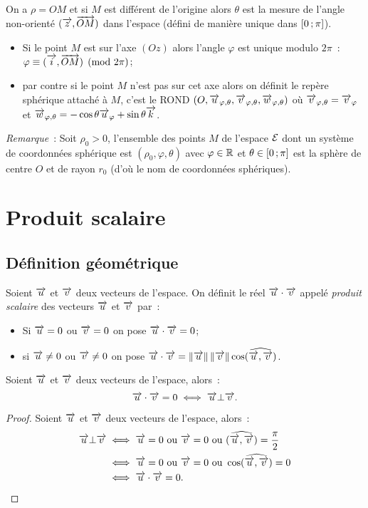 On a $\rho=OM$ et si $M$ est différent de l'origine alors $\theta$ est la mesure de l'angle non-orienté $(\overrightarrow{z},\overrightarrow{OM})$ dans l'espace (défini de manière unique dans $\left[ 0 \, ;  \pi \right]$).
\begin{itemize}
\item Si le point $M$ est sur l'axe $(Oz)$ alors l'angle $\varphi$ est unique modulo $2\pi$~: $\varphi \equiv (\overrightarrow{i},\overrightarrow{OM}) \pmod {2\pi}$;
\item par contre si le point $M$ n'est pas sur cet axe alors on définit le repère sphérique attaché à $M$, c'est le ROND $(O,\overrightarrow{u}_{\varphi,\theta},\overrightarrow{v}_{\varphi,\theta},\overrightarrow{w}_{\varphi,\theta})$ où $\overrightarrow{v}_{\varphi,\theta}=\overrightarrow{v}_{\varphi}$ et $\overrightarrow{w}_{\varphi,\theta}=-\cos\theta\overrightarrow{u}_\varphi+\sin\theta\overrightarrow{k}$.
\end{itemize}

\emph{Remarque}~: Soit $\rho_0>0$, l'ensemble des points $M$ de l'espace $\mathcal{E}$ dont un système de coordonnées sphérique est $(\rho_0,\varphi,\theta)$ avec $\varphi\in\mathbb{R}$ et $\theta\in \left[ 0 \, ;  \pi \right]$ est la sphère de centre $O$ et de rayon $r_0$ (d'où le nom de coordonnées sphériques).

\section{Produit scalaire}
\subsection{Définition géométrique}
\begin{defdef}
  Soient $\overrightarrow{u}$ et $\overrightarrow{v}$ deux vecteurs de l'espace. On définit le réel $\overrightarrow{u}\cdot\overrightarrow{v}$ appelé \emph{produit scalaire} des vecteurs $\overrightarrow{u}$ et $\overrightarrow{v}$ par~:
  \begin{itemize}
  \item Si $\overrightarrow{u}=0$ ou $\overrightarrow{v}=0$ on pose $\overrightarrow{u}\cdot\overrightarrow{v}=0$;
  \item si $\overrightarrow{u}\neq 0$ ou $\overrightarrow{v}\neq 0$ on pose $\overrightarrow{u}\cdot\overrightarrow{v}=\left\lVert\overrightarrow{u}\right\rVert\left\lVert\overrightarrow{v}\right\rVert\cos(\widehat{\overrightarrow{u},\overrightarrow{v}})$.
  \end{itemize}
\end{defdef}
\begin{prop}
Soient $\overrightarrow{u}$ et $\overrightarrow{v}$ deux vecteurs de l'espace, alors~:
\begin{equation}
  \overrightarrow{u}\cdot\overrightarrow{v}=0 \iff \overrightarrow{u} \bot \overrightarrow{v}.
\end{equation}
\end{prop}
\begin{proof}
  Soient $\overrightarrow{u}$ et $\overrightarrow{v}$ deux vecteurs de l'espace, alors~:
  \begin{align}
    \overrightarrow{u} \bot \overrightarrow{v} &\iff \overrightarrow{u}=0 \text{~ou~} \overrightarrow{v}=0 \text{~ou~} (\widehat{\overrightarrow{u},\overrightarrow{v}})=\frac{\pi}{2}\\
&\iff \overrightarrow{u}=0 \text{~ou~} \overrightarrow{v}=0 \text{~ou~} \cos(\widehat{\overrightarrow{u},\overrightarrow{v}})=0\\
&\iff \overrightarrow{u}\cdot\overrightarrow{v}=0.
  \end{align}
\end{proof}

